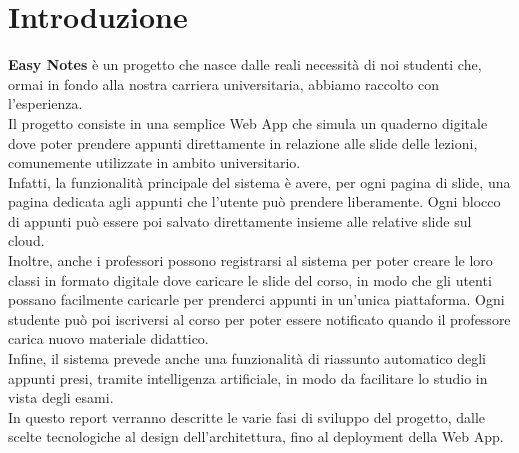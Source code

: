 \chapter{Introduzione}
\textbf{Easy Notes} è un progetto che nasce dalle reali necessità di noi studenti che,
ormai in fondo alla nostra carriera universitaria, abbiamo raccolto con l'esperienza. \\
Il progetto consiste in una semplice Web App che simula un quaderno digitale dove poter
prendere appunti direttamente in relazione alle slide delle lezioni, comunemente utilizzate
in ambito universitario. \\
Infatti, la funzionalità principale del sistema è avere, per ogni
pagina di slide, una pagina dedicata agli appunti che l'utente può prendere liberamente.
Ogni blocco di appunti può essere poi salvato direttamente insieme alle relative slide sul cloud. \\
Inoltre, anche i professori possono registrarsi al sistema per poter creare le loro classi in 
formato digitale dove caricare le slide del corso, in modo che gli utenti possano facilmente
caricarle per prenderci appunti in un'unica piattaforma. Ogni studente può poi iscriversi al corso
per poter essere notificato quando il professore carica nuovo materiale didattico. \\
Infine, il sistema prevede anche una funzionalità di riassunto automatico degli appunti presi,
tramite intelligenza artificiale, in modo da facilitare lo studio in vista degli esami. \\
In questo report verranno descritte le varie fasi di sviluppo del progetto, dalle
scelte tecnologiche al design dell'architettura, fino al deployment della Web App.